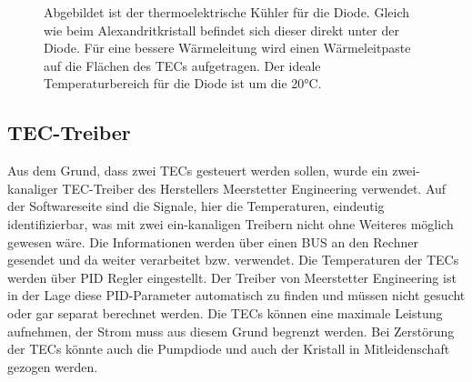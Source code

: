 \begin{figure}
    \centering
    \caption{Abgebildet ist der thermoelektrische Kühler für die Diode. Gleich wie beim Alexandritkristall befindet sich dieser direkt unter der Diode. Für eine bessere Wärmeleitung wird einen Wärmeleitpaste auf die Flächen des TECs aufgetragen. Der ideale Temperaturbereich für die Diode ist um die 20°C.}
    \label{fig:tec_di_hw}
\end{figure}

\subsection{TEC-Treiber}
\label{label_tec_treiber}
Aus dem Grund, dass zwei TECs gesteuert werden sollen, wurde ein zwei-kanaliger TEC-Treiber des Herstellers Meerstetter Engineering verwendet. Auf der Softwareseite sind die Signale, hier die Temperaturen, eindeutig identifizierbar, was mit zwei ein-kanaligen Treibern nicht ohne Weiteres möglich gewesen wäre. Die Informationen werden über einen BUS an den Rechner gesendet und da weiter verarbeitet bzw. verwendet.
Die Temperaturen der TECs werden über PID Regler eingestellt. Der Treiber von Meerstetter Engineering ist in der Lage diese PID-Parameter automatisch zu finden und müssen nicht gesucht oder gar separat berechnet werden. Die TECs können eine maximale Leistung aufnehmen, der Strom muss aus diesem Grund begrenzt werden. Bei Zerstörung der TECs könnte auch die Pumpdiode und auch der Kristall in Mitleidenschaft gezogen werden.\\


